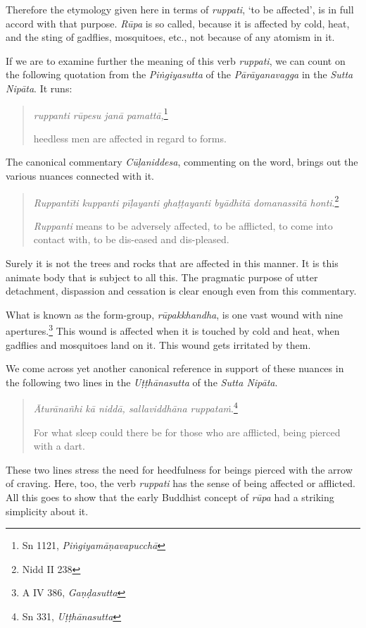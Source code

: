 Therefore the etymology given here in terms of \emph{ruppati}, `to be affected', is in full accord with that purpose. \emph{Rūpa} is so called, because it is affected by cold, heat, and the sting of gadflies, mosquitoes, etc., not because of any atomism in it.

If we are to examine further the meaning of this verb \emph{ruppati}, we can count on the following quotation from the \emph{Piṅgiyasutta} of the \emph{Pārāyanavagga} in the \emph{Sutta Nipāta}. It runs:

\begin{quote}
\emph{ruppanti rūpesu janā pamattā,}\footnote{Sn 1121, \emph{Piṅgiyamāṇavapucchā}}

heedless men are affected in regard to forms.
\end{quote}

The canonical commentary \emph{Cūḷaniddesa}, commenting on the word, brings out the various nuances connected with it.

\begin{quote}
\emph{Ruppantīti kuppanti pīḷayanti ghaṭṭayanti byādhitā domanassitā honti}.\footnote{Nidd II 238}

\emph{Ruppanti} means to be adversely affected, to be afflicted, to come into contact with, to be dis-eased and dis-pleased.
\end{quote}

Surely it is not the trees and rocks that are affected in this manner. It is this animate body that is subject to all this. The pragmatic purpose of utter detachment, dispassion and cessation is clear enough even from this commentary.

What is known as the form-group, \emph{rūpakkhandha}, is one vast wound with nine apertures.\footnote{A IV 386, \emph{Gaṇḍasutta}} This wound is affected when it is touched by cold and heat, when gadflies and mosquitoes land on it. This wound gets irritated by them.

We come across yet another canonical reference in support of these nuances in the following two lines in the \emph{Uṭṭhānasutta} of the \emph{Sutta Nipāta}.

\begin{quote}
\emph{Āturānañhi kā niddā, sallaviddhāna ruppataṁ}.\footnote{Sn 331, \emph{Uṭṭhānasutta}}

For what sleep could there be for those who are afflicted, being pierced with a dart.
\end{quote}

These two lines stress the need for heedfulness for beings pierced with the arrow of craving. Here, too, the verb \emph{ruppati} has the sense of being affected or afflicted. All this goes to show that the early Buddhist concept of \emph{rūpa} had a striking simplicity about it.

